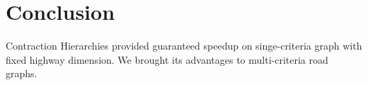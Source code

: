 

\section{Conclusion}
\label{secConclusion}
Contraction Hierarchies provided guaranteed speedup on singe-criteria graph
with fixed highway dimension. We brought its advantages to multi-criteria 
road graphs.



